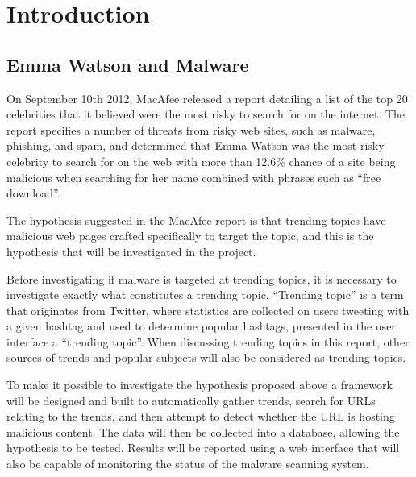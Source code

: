 \section{Introduction}

\subsection{Emma Watson and Malware}
On September 10th 2012, MacAfee released a report detailing a list of the top 20
celebrities that it believed were the most risky to search for on the internet\cite{mac-watson}.
The report specifies a number of threats from risky web sites, such as malware,
phishing, and spam, and determined that Emma Watson was the most risky celebrity
to search for on the web with more than 12.6\% chance of a site being malicious
when searching for her name combined with phrases such as ``free download''.

The hypothesis suggested in the MacAfee report is that trending topics have
malicious web pages crafted specifically to target the topic, and this is the
hypothesis that will be investigated in the project.

Before investigating if malware is targeted at trending topics, it is necessary to
investigate exactly what constitutes a trending topic. ``Trending topic'' is a term
that originates from Twitter, where statistics are collected on users tweeting
with a given hashtag and used to determine popular hashtags, presented in the
user interface a ``trending topic''. When discussing trending topics in this
report, other sources of trends and popular subjects will also be considered as
trending topics.

To make it possible to investigate the hypothesis proposed above a framework
will be designed and built to automatically gather trends, search for URLs
relating to the trends, and then attempt to detect whether the URL is hosting
malicious content. The data will then be collected into a database, allowing the
hypothesis to be tested. Results will be reported using a web interface that
will also be capable of monitoring the status of the malware scanning system.


